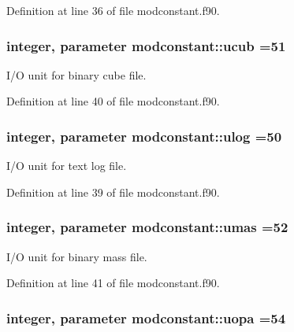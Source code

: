 Definition at line 36 of file modconstant.\+f90.

\subsubsection[{\texorpdfstring{ucub}{ucub}}]{\setlength{\rightskip}{0pt plus 5cm}integer, parameter modconstant\+::ucub =51}\hypertarget{namespacemodconstant_acb8d6ab8e571b34dcb11638e425e57db}{}\label{namespacemodconstant_acb8d6ab8e571b34dcb11638e425e57db}


I/O unit for binary cube file. 



Definition at line 40 of file modconstant.\+f90.

\subsubsection[{\texorpdfstring{ulog}{ulog}}]{\setlength{\rightskip}{0pt plus 5cm}integer, parameter modconstant\+::ulog =50}\hypertarget{namespacemodconstant_a6921eef21b749faf744304003fa3ac63}{}\label{namespacemodconstant_a6921eef21b749faf744304003fa3ac63}


I/O unit for text log file. 



Definition at line 39 of file modconstant.\+f90.

\subsubsection[{\texorpdfstring{umas}{umas}}]{\setlength{\rightskip}{0pt plus 5cm}integer, parameter modconstant\+::umas =52}\hypertarget{namespacemodconstant_a542f50ea5e4225b1340cbcbca9eb30ee}{}\label{namespacemodconstant_a542f50ea5e4225b1340cbcbca9eb30ee}


I/O unit for binary mass file. 



Definition at line 41 of file modconstant.\+f90.

\subsubsection[{\texorpdfstring{uopa}{uopa}}]{\setlength{\rightskip}{0pt plus 5cm}integer, parameter modconstant\+::uopa =54}\hypertarget{namespacemodconstant_a545e6e3d5c24f9ce81e3f88999f57b41}{}\label{namespacemodconstant_a545e6e3d5c24f9ce81e3f88999f57b41}



